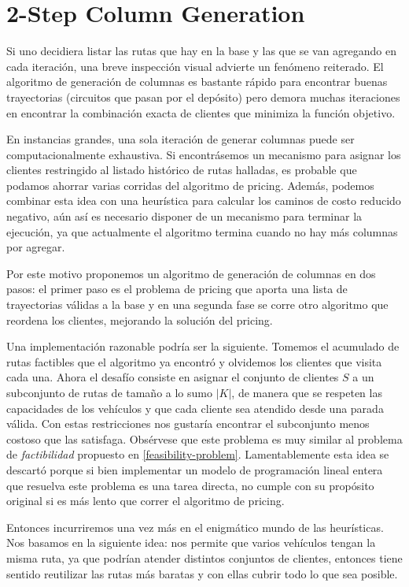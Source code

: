 \section{2-Step Column Generation}
\label{section:2-step-cg}

Si uno decidiera listar las rutas que hay en la base y las que se van agregando en cada iteración, una breve inspección visual advierte un fenómeno reiterado. El algoritmo de generación de columnas es bastante rápido para encontrar buenas trayectorias (circuitos que pasan por el depósito) pero demora muchas iteraciones en encontrar la combinación exacta de clientes que minimiza la función objetivo.  

En instancias grandes, una sola iteración de generar columnas puede ser com\-putacionalmente exhaustiva. Si encontrásemos un mecanismo para asignar los clientes restringido al listado histórico de rutas halladas, es probable que podamos ahorrar varias corridas del algoritmo de pricing. Además, podemos combinar esta idea con una heurística para calcular los caminos de costo reducido negativo, aún así es necesario disponer de un mecanismo para terminar la ejecución, ya que actualmente el algoritmo termina cuando no hay más columnas por agregar.

Por este motivo proponemos un algoritmo de generación de columnas en dos pasos: el primer paso es el problema de pricing que aporta una lista de trayectorias válidas a la base y en una segunda fase se corre otro algoritmo que reordena los clientes, mejorando la solución del pricing.

Una implementación razonable podría ser la siguiente. Tomemos el acumulado de rutas factibles que el algoritmo ya encontró y olvidemos los clientes que visita cada una. Ahora el desafío consiste en asignar el conjunto de clientes $S$ a un subconjunto de rutas de tamaño a lo sumo $|K|$, de manera que se respeten las capacidades de los vehículos y que cada cliente sea atendido desde una parada válida. Con estas restricciones nos gustaría encontrar el subconjunto menos costoso que las satisfaga. Obsérvese que este problema es muy similar al problema de \emph{factibilidad} propuesto en \ref{feasibility-problem}. Lamentablemente esta idea se descartó porque si bien implementar un modelo de programación lineal entera que resuelva este problema es una tarea directa, no cumple con su propósito original si es más lento que correr el algoritmo de pricing. 

Entonces incurriremos una vez más en el enigmático mundo de las heurísticas. Nos basamos en la siguiente idea:  nos permite que varios vehículos tengan la misma ruta, ya que podrían atender distintos conjuntos de clientes, entonces tiene sentido reutilizar las rutas más baratas y con ellas cubrir todo lo que sea posible. 

